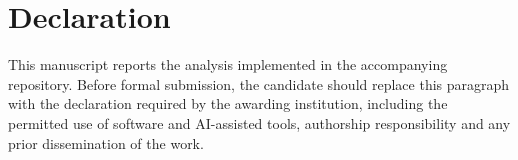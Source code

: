 \chapter*{Declaration}
\label{chap:declaration}

This manuscript reports the analysis implemented in the accompanying repository. Before formal submission, the candidate should replace this paragraph with the declaration required by the awarding institution, including the permitted use of software and AI-assisted tools, authorship responsibility and any prior dissemination of the work.
